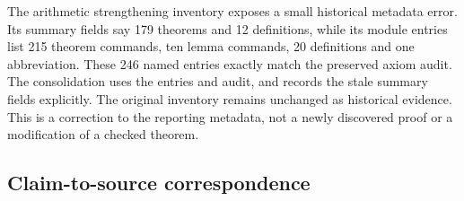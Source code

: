 The arithmetic strengthening inventory exposes a small historical metadata
error. Its summary fields say 179 theorems and 12 definitions, while its
module entries list 215 theorem commands, ten lemma commands,
20 definitions and one abbreviation. These 246 named entries exactly match
the preserved axiom audit. The consolidation uses the entries and audit, and
records the stale summary fields explicitly. The original inventory remains
unchanged as historical evidence. This is a correction to the reporting
metadata, not a newly discovered proof or a modification of a checked theorem.

\subsection{Claim-to-source correspondence}

